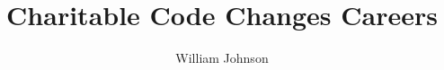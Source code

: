 \documentclass{report}
\begin{document}
\title{Charitable Code Changes Careers}
\author{William Johnson}
\maketitle
\tableofcontents






\end{document}
